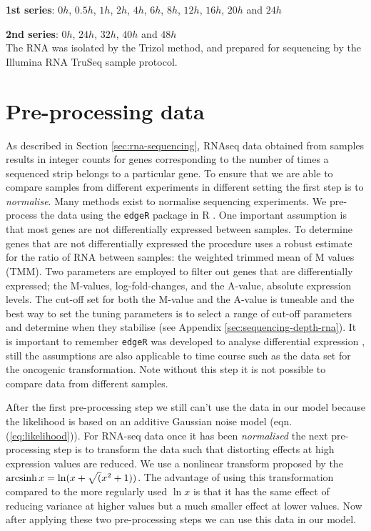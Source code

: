 \textbf{1st series}: $0h$, $0.5h$, $1h$, $2h$, $4h$, $6h$, $8h$, $12h$, $16h$, $20h$ and $24h$

\textbf{2nd series}: $0h$, $24h$, $32h$, $40h$ and $48h$ \\
The RNA was isolated by the Trizol method, and prepared for sequencing by the Illumina RNA TruSeq sample protocol.


\section{Pre-processing data}
\label{sec:norm-stand}

As described in Section \ref{sec:rna-sequencing}, RNAseq data obtained from samples results in integer counts for genes corresponding to the number of times a sequenced strip belongs to a particular gene. To ensure that we are able to compare samples from different experiments in different setting the first step is to \emph{normalise}. Many methods exist to normalise sequencing experiments. We pre-process the data using the \texttt{edgeR} package in R \citep{McCarthy:2012wg,Robinson:2010cw}. One important assumption is that most genes are not differentially expressed between samples. To determine genes that are not differentially expressed the procedure uses a robust estimate for the ratio of RNA between samples: the weighted trimmed mean of M values (TMM). Two parameters are employed to filter out genes that are differentially expressed; the M-values, log-fold-changes, and the A-value, absolute expression levels. The cut-off set for both the M-value and the A-value is tuneable and the best way to set the tuning parameters is to select a range of cut-off parameters and determine when they stabilise (see Appendix \ref{sec:sequencing-depth-rna}). It is important to remember \texttt{edgeR} was developed to analyse differential expression \citep{Robinson:2010dd}, still the assumptions are also applicable to time course such as the data set for the oncogenic transformation. Note without this step it is not possible to compare data from different samples.

After the first pre-processing step we still can't use the data in our model because the likelihood is based on an additive Gaussian noise model (eqn. (\ref{eq:likelihood})). For RNA-seq data once it has been \emph{normalised} the next pre-processing step is to transform the data such that distorting effects at high expression values are reduced. We use a nonlinear transform proposed by \cite{Hoffman:2012gn} the $\operatorname{arcsinh} x = \ln(x + \sqrt (x^2 + 1))$. The advantage of using this transformation compared to the more regularly used $\ln x$ is that it has the same effect of reducing variance at higher values but a much smaller effect at lower values. Now after applying these two pre-processing steps we can use this data in our model.

